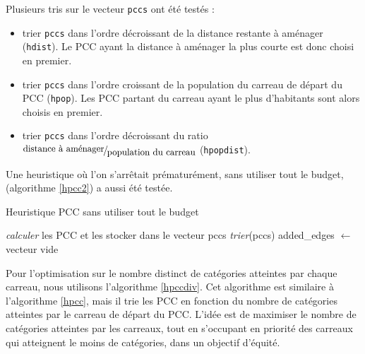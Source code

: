 Plusieurs tris sur le vecteur \texttt{pccs} ont été testés : 
\begin{itemize} \label{item:tris}
    \item trier \texttt{pccs} dans l'ordre décroissant de la distance restante à aménager (\verb|hdist|). Le PCC ayant la distance à aménager la plus courte est donc choisi en premier.
    \item trier \texttt{pccs} dans l'ordre croissant de la population du carreau de départ du PCC (\verb|hpop|). Les PCC partant du carreau ayant le plus d'habitants sont alors choisis en premier.
    \item trier \texttt{pccs} dans l'ordre décroissant du ratio $\fFrac{\text{distance à aménager}}{\text{population du carreau}}$ (\verb|hpopdist|).
\end{itemize}


Une heuristique où l'on s'arrêtait prématurément, sans utiliser tout le budget, (algorithme \ref{hpcc2}) a aussi été testée. 

\begin{algorithm}[!ht]
\DontPrintSemicolon
\caption{Heuristique PCC sans utiliser tout le budget}
\label{hpcc2}
\emph{calculer} les PCC et les stocker dans le vecteur pccs\;
\emph{trier}(pccs) 
added\_edges $\leftarrow$ vecteur vide \;
\end{algorithm}

Pour l'optimisation sur le nombre distinct de catégories atteintes par chaque carreau, nous utilisons l'algorithme \ref{hpccdiv}. Cet algorithme est similaire à l'algorithme \ref{hpcc}, mais il trie les PCC en fonction du nombre de catégories atteintes par le carreau de départ du PCC. L'idée est de maximiser le nombre de catégories atteintes par les carreaux, tout en s'occupant en priorité des carreaux qui atteignent le moins de catégories, dans un objectif d'équité.


